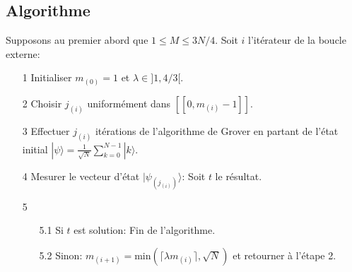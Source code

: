 \subsection{Algorithme}
Supposons au premier abord que $1 \leq M \leq 3N/4$. Soit $i$ l'itérateur de la boucle externe:
\begin{itemize}
	\item[1] Initialiser $m_{(0)}=1$ et $\lambda \in ]1, 4/3[$.
	\item[2] Choisir $j_{(i)}$ uniformément dans $[\![0, m_{(i)}-1]\!]$.
	\item[3] Effectuer $j_{(i)}$ itérations de l'algorithme de Grover en partant de l'état initial $| \psi \rangle = \frac{1}{\sqrt{N}} \sum_{k=0}^{N-1} |k\rangle$.
	\item[4] Mesurer le vecteur d'état $| \psi_{(j_{(i)})} \rangle$: Soit $t$ le résultat.
	\item[5]
	\begin{itemize}
    	\item[5.1] Si $t$ est solution: Fin de l'algorithme.
    	\item[5.2] Sinon: $m_{(i+1)} = \mathrm{min}(\lceil \lambda m_{(i)} \rceil, \sqrt{N})$ et retourner à l'étape 2.
	\end{itemize}
\end{itemize}

